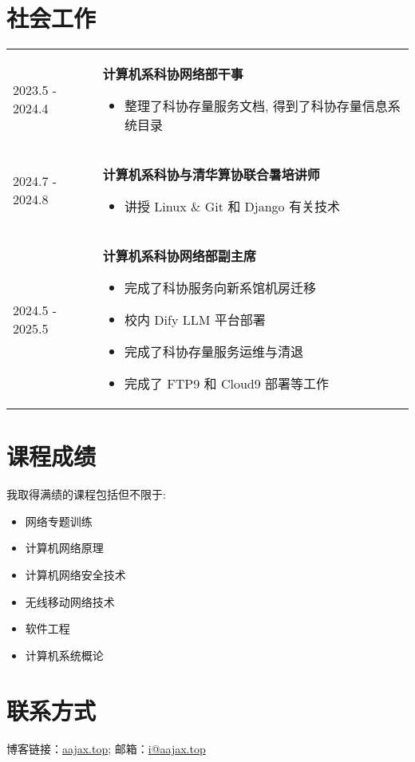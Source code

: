 \documentclass[a4paper, 10pt]{article}
\begin{document}
\section*{社会工作}
\noindent
\begin{tabular}{p{}p{}}
    2023.5 - 2024.4 & \textbf{计算机系科协网络部干事}
        \fontsize{8pt}{10pt}\selectfont
        \begin{itemize}[left=0pt,topsep=0pt,partopsep=0pt,parsep=0pt,itemsep=0pt]
            \item 整理了科协存量服务文档, 得到了科协存量信息系统目录
        \end{itemize} \\

    2024.7 - 2024.8 & \textbf{计算机系科协与清华算协联合暑培讲师}
        \fontsize{8pt}{10pt}\selectfont
        \begin{itemize}[left=0pt,topsep=0pt,partopsep=0pt,parsep=0pt,itemsep=0pt]
            \item 讲授 Linux \& Git 和 Django 有关技术
        \end{itemize} \\

    2024.5 - 2025.5 & \textbf{计算机系科协网络部副主席}
        \fontsize{8pt}{10pt}\selectfont
        \begin{itemize}[left=0pt,topsep=0pt,partopsep=0pt,parsep=0pt,itemsep=0pt]
            \item 完成了科协服务向新系馆机房迁移
            \item 校内 Dify LLM 平台部署
            \item 完成了科协存量服务运维与清退
            \item 完成了 FTP9 和 Cloud9 部署等工作
        \end{itemize}
\end{tabular}

\section*{课程成绩}
\noindent 我取得满绩的课程包括但不限于:
\begin{itemize}[left=20pt]
    \setlength{\itemsep}{0pt}
    \item 网络专题训练
    \item 计算机网络原理
    \item 计算机网络安全技术
    \item 无线移动网络技术
    \item 软件工程
    \item 计算机系统概论
\end{itemize}

\section*{联系方式}
\noindent 博客链接：\href{https://aajax.top}{aajax.top}; 邮箱：\href{mailto:i@aajax.top}{i@aajax.top}
\end{document}
